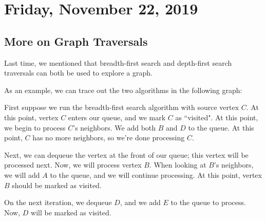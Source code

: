 \section{Friday, November 22, 2019}

\subsection{More on Graph Traversals}

Last time, we mentioned that breadth-first search and depth-first search traversals can both be used to explore a graph. 

As an example, we can trace out the two algorithms in the following graph:

\begin{figure}[h]
\centering
{}
\end{figure}

First suppose we run the breadth-first search algorithm with source vertex $C$. At this point, vertex $C$ enters our queue, and we mark $C$ as ``visited". At this point, we begin to process $C$'s neighbors. We add both $B$ and $D$ to the queue. At this point, $C$ has no more neighbors, so we're done processing $C$. 

Next, we can dequeue the vertex at the front of our queue; this vertex will be processed next. Now, we will process vertex $B$. When looking at $B$'s neighbors, we will add $A$ to the queue, and we will continue processing. At this point, vertex $B$ should be marked as visited.

On the next iteration, we dequeue $D$, and we add $E$ to the queue to process. Now, $D$ will be marked as visited. 

